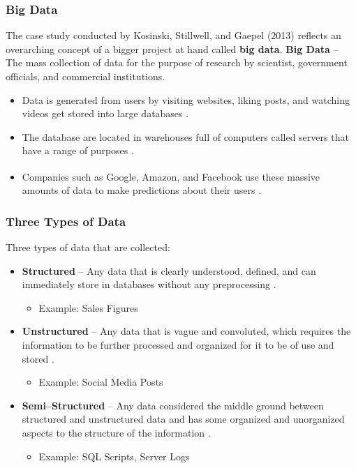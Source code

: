 \documentclass{beamer}
\begin{document}
\begin{frame}
\frametitle{Big Data}
\footnotesize
 The case study conducted by Kosinski, Stillwell, and Gaepel (2013) reflects an overarching concept of a bigger project at hand called \textbf{big data}.
\newline
\newline
\textbf{Big Data} -- The mass collection of  data for the purpose of research by scientist,  government officials, and commercial institutions.
   \begin{itemize}
    \item Data is generated from users by visiting websites, liking posts, and watching videos get stored into large databases \cite{Jeble2016}. 

    \item The database are located in warehouses full of computers called servers that have a range of purposes \cite{Jeble2016}.

   \item Companies such as Google\textsuperscript{\textregistered}, Amazon\textsuperscript{\textregistered}, and Facebook\textsuperscript{\textregistered}
use these massive amounts of data to make predictions about their users \cite{Jeble2016}.
    \end{itemize}

\end{frame}

\begin{frame}
\frametitle{Three Types of Data}
\footnotesize
Three types of data that are collected:
    \begin{itemize}
    \item \textbf{Structured} -- Any data that is clearly understood, defined, and can immediately store in databases without any preprocessing \cite{Jeble2016}.
        \begin{itemize}
        \item Example: Sales Figures
        \end{itemize}
    \item \textbf{Unstructured} -- Any data that is vague and convoluted, which requires the information to be further processed and organized for it to be of use and stored \cite{Jeble2016}.
        \begin{itemize}
        \item Example: Social Media Posts
        \end{itemize}
    \item \textbf{Semi--Structured} -- Any data considered the middle ground between structured and unstructured data and has some organized and unorganized aspects to the structure of the information \cite{Jeble2016}.
        \begin{itemize}
        \item Example: SQL Scripts, Server Logs
        \end{itemize}
    \end{itemize}

\end{frame}
\end{document}
